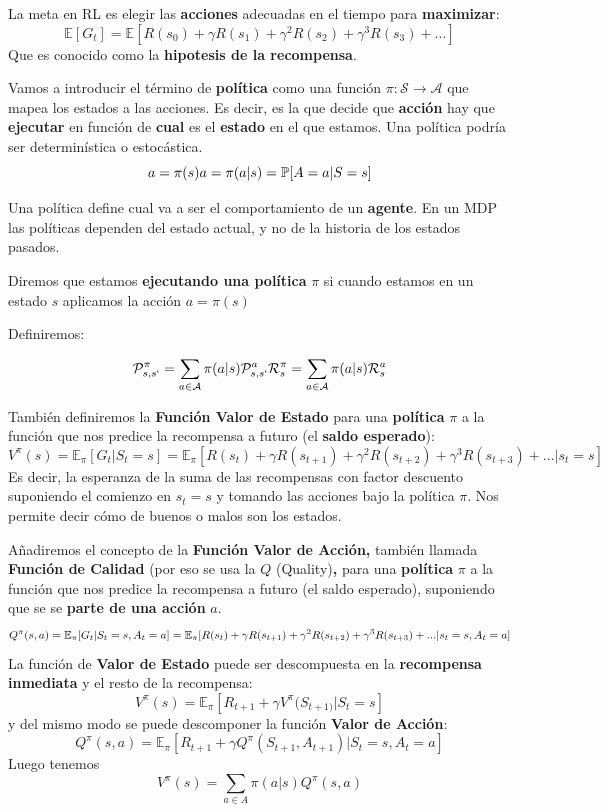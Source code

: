 \documentclass[
  a4paper,
  DIV=11,
  numbers=noendperiod]{scrreprt}
\begin{document}
La meta en RL es elegir las \textbf{acciones} adecuadas en el tiempo
para \textbf{maximizar}:
\[\mathbb E[G_t] =\mathbb E[R(s_0) + \gamma R(s_1) + \gamma^2 R(s_2) + \gamma^3 R(s_3) + ...]\]
Que es conocido como la \textbf{hipotesis de la recompensa}.

Vamos a introducir el término de \textbf{política} como una función
\(\pi : \mathcal S \rightarrow \mathcal A\) que mapea los estados a las
acciones. Es decir, es la que decide que \textbf{acción} hay que
\textbf{ejecutar} en función de \textbf{cual} es el \textbf{estado} en
el que estamos. Una política podría ser determinística o estocástica. \[
a = \pi(s) \\
a = \pi (a|s)=\mathbb P[A=a|S=s]
\]

Una política define cual va a ser el comportamiento de un
\textbf{agente}. En un MDP las políticas dependen del estado actual, y
no de la historia de los estados pasados.

Diremos que estamos \textbf{ejecutando una política} \(\pi\) si cuando
estamos en un estado \(s\) aplicamos la acción \(a=\pi(s)\)

Definiremos:

\[
\mathcal P_{s,s`}^\pi = \sum_{a \in \mathcal A}\pi(a|s)\mathcal P_{s,s`}^a \\
\mathcal R_{s}^\pi = \sum_{a \in \mathcal A}\pi(a|s)\mathcal R_{s}^a 
\]

También definiremos la \textbf{Función Valor de Estado} para una
\textbf{política} \(\pi\) a la función que nos predice la recompensa a
futuro (el \textbf{saldo esperado}):
\[V^{\pi}(s)=\mathbb E_\pi[G_t|S_t=s]=
\mathbb E_\pi[R(s_t) + \gamma R(s_{t+1}) + \gamma^2 R(s_{t+2}) + \gamma^3 R(s_{t+3}) + ...|s_t=s]\]
Es decir, la esperanza de la suma de las recompensas con factor
descuento suponiendo el comienzo en \(s_t=s\) y tomando las acciones
bajo la política \(\pi\). Nos permite decir cómo de buenos o malos son
los estados.

Añadiremos el concepto de la \textbf{Función Valor de Acción,} también
llamada \textbf{Función de Calidad} (por eso se usa la \(Q\)
(Quality)\textbf{,} para una \textbf{política} \(\pi\) a la función que
nos predice la recompensa a futuro (el saldo esperado), suponiendo que
se se \textbf{parte de una acción} \(a\). \[
Q^\pi(s,a)=\mathbb E_\pi[G_t|S_t=s,A_t=a]\\
=\mathbb E_\pi[R(s_t) + \gamma R(s_{t+1}) + \gamma^2 R(s_{t+2}) + \gamma^3 R(s_{t+3}) + ...|s_t=s,A_t=a]
\] La función de \textbf{Valor de Estado} puede ser descompuesta en la
\textbf{recompensa inmediata} y el resto de la recompensa: \[
V^\pi(s) = \mathbb E_\pi[R_{t+1}+\gamma V^\pi(S_{t+1)}|S_t=s]
\] y del mismo modo se puede descomponer la función \textbf{Valor de
Acción}: \[
Q^\pi(s,a) = \mathbb E_\pi[R_{t+1}+\gamma Q^\pi(S_{t+1}, A_{t+1})|S_t=s,A_t=a]
\] Luego tenemos \[
V^\pi(s) = \sum_{a\in A}\pi(a|s)Q^\pi(s,a)
\]
\end{document}
